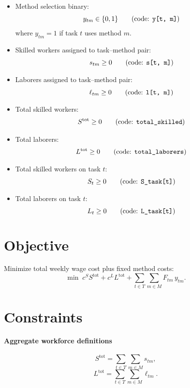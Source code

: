 \begin{itemize}
    \item Method selection binary:
    \[
    y_{tm} \in \{0,1\}
    \qquad\text{(code: \texttt{y[t, m]})}
    \]
    where $y_{tm}=1$ if task $t$ uses method $m$.
    
    \item Skilled workers assigned to task--method pair:
    \[
    s_{tm} \ge 0
    \qquad\text{(code: \texttt{s[t, m]})}
    \]
    
    \item Laborers assigned to task--method pair:
    \[
    \ell_{tm} \ge 0
    \qquad\text{(code: \texttt{l[t, m]})}
    \]
    
    \item Total skilled workers:
    \[
    S^{\mathrm{tot}} \ge 0
    \qquad\text{(code: \texttt{total\_skilled})}
    \]
    
    \item Total laborers:
    \[
    L^{\mathrm{tot}} \ge 0
    \qquad\text{(code: \texttt{total\_laborers})}
    \]
    
    \item Total skilled workers on task $t$:
    \[
    S_t \ge 0
    \qquad\text{(code: \texttt{S\_task[t]})}
    \]
    
    \item Total laborers on task $t$:
    \[
    L_t \ge 0
    \qquad\text{(code: \texttt{L\_task[t]})}
    \]
\end{itemize}

\section*{Objective}

Minimize total weekly wage cost plus fixed method costs:
\[
\min \;
c^S S^{\mathrm{tot}}
+
c^L L^{\mathrm{tot}}
+
\sum_{t\in T}\sum_{m\in M} F_{tm}\, y_{tm}.
\]

\section*{Constraints}

\paragraph{Aggregate workforce definitions}
\[
S^{\mathrm{tot}} = \sum_{t\in T}\sum_{m\in M} s_{tm},
\]
\[
L^{\mathrm{tot}} = \sum_{t\in T}\sum_{m\in M} \ell_{tm}.
\]

